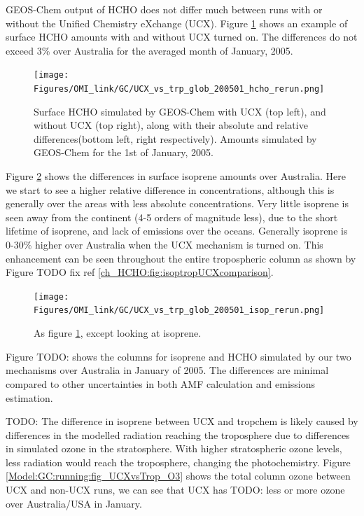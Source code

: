       GEOS-Chem output of HCHO does not differ much between runs with or without the Unified Chemistry eXchange (UCX).
      Figure \ref{Model:GC:running:fig_UCXvsTrop_HCHO} shows an example of surface HCHO amounts with and without UCX turned on.
      The differences do not exceed 3\% over Australia for the averaged month of January, 2005.
      
      \begin{figure}%
        \texttt{[image: Figures/OMI\_link/GC/UCX\_vs\_trp\_glob\_200501\_hcho\_rerun.png]}
        \caption{ %
          Surface HCHO simulated by GEOS-Chem with UCX (top left), and without UCX (top right), along with their absolute and relative differences(bottom left, right respectively).
          Amounts simulated by GEOS-Chem for the 1st of January, 2005.
        }
        \label{Model:GC:running:fig_UCXvsTrop_HCHO}
      \end{figure}
      
      Figure \ref{Model:GC:running:fig_UCXvsTrop_Isop} shows the differences in surface isoprene amounts over Australia.
      Here we start to see a higher relative difference in concentrations, although this is generally over the areas with less absolute concentrations. 
      Very little isoprene is seen away from the continent (4-5 orders of magnitude less), due to the short lifetime of isoprene, and lack of emissions over the oceans.
      Generally isoprene is 0-30\% higher over Australia when the UCX mechanism is turned on.
      This enhancement can be seen throughout the entire tropospheric column as shown by Figure TODO fix ref \ref{ch_HCHO:fig:isoptropUCXcomparison}. %
      \begin{figure}%
        \texttt{[image: Figures/OMI\_link/GC/UCX\_vs\_trp\_glob\_200501\_isop\_rerun.png]}
        \caption{ %
          As figure \ref{Model:GC:running:fig_UCXvsTrop_HCHO}, except looking at isoprene. 
        }      
        \label{Model:GC:running:fig_UCXvsTrop_Isop}
      \end{figure}
      
      
      Figure TODO: shows the columns for isoprene and HCHO simulated by our two mechanisms over Australia in January of 2005.
      The differences are minimal compared to other uncertainties in both AMF calculation and emissions estimation.
      
      
      TODO: The difference in isoprene between UCX and tropchem is likely caused by differences in the modelled radiation reaching the troposphere due to differences in simulated ozone in the stratosphere.
      With higher stratospheric ozone levels, less radiation would reach the troposphere, changing the photochemistry.
      Figure \ref{Model:GC:running:fig_UCXvsTrop_O3} shows the total column ozone between UCX and non-UCX runs, we can see that UCX has TODO: less or more ozone over Australia/USA in January.
          

